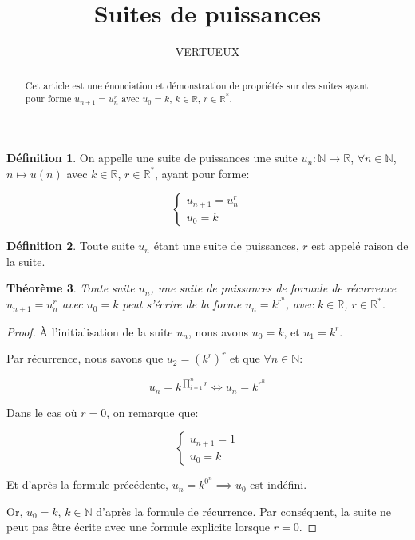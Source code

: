 \documentclass{amsart}
\newtheorem{theorem}{Théorème}[section]
\theoremstyle{definition}
\newtheorem{definition}[theorem]{Définition}
\theoremstyle{remark}
\numberwithin{equation}{section}
\begin{document}
\title{Suites de puissances}

\author{VERTUEUX}

\begin{abstract}
    Cet article est une énonciation et démonstration de propriétés sur des suites ayant pour forme $u_{n+1}=u_n^r$ avec $u_0=k$, $k \in \mathbb{R}$, $r \in \mathbb{R^*}$.
\end{abstract}

\maketitle

\begin{definition}
    On appelle une suite de puissances une suite $u_n:\mathbb{N} \rightarrow \mathbb{R}$, $\forall n \in \mathbb{N}$, $n \mapsto u(n)$ avec $k \in \mathbb{R}$, $r \in \mathbb{R^*}$, ayant pour forme: 

    \[\begin{cases} 
        u_{n+1}=u_n^r \\
        u_0=k
    \end{cases}\]
\end{definition}

\begin{definition}
    Toute suite $u_n$ étant une suite de puissances, $r$ est appelé raison de la suite.
\end{definition}

\begin{theorem}
    Toute suite $u_n$, une suite de puissances de formule de récurrence $u_{n+1}=u_n^r$ avec $u_0=k$ peut s'écrire de la forme $u_n=k^{r^n}$, avec $k \in \mathbb{R}$, $r \in \mathbb{R^*}$.
\end{theorem}

\begin{proof}
    À l'initialisation de la suite $u_n$, nous avons $u_0 = k$, et $u_1 = k^r$.

    Par récurrence, nous savons que $u_2 = (k^r)^r$ et que $\forall n \in \mathbb{N}$:
    
    \[u_n = k^{\prod_{i=1}^{n}r} \iff u_n = k^{r^n}\]

    Dans le cas où $r = 0$, on remarque que: 

    \[\begin{cases} 
        u_{n+1}=1 \\
        u_0=k
    \end{cases}\]

    Et d'après la formule précédente, $u_n = k^{0^n} \implies u_0$ est indéfini.

    Or, $u_0 = k$, $k \in \mathbb{N}$ d'après la formule de récurrence. Par conséquent, la suite ne peut pas être écrite avec une formule explicite lorsque $r=0$.

\end{proof} 
\end{document}
